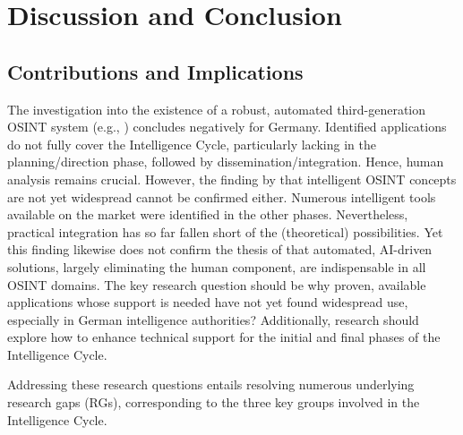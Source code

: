\documentclass[10pt]{article}
\begin{document}
\section{Discussion and Conclusion} \label{sec:discussion}
\subsection{Contributions and Implications}

The investigation into the existence of a robust, automated third-generation OSINT system (e.g., \cite{Ghioni.2023}) concludes negatively for Germany. Identified applications do not fully cover the Intelligence Cycle, particularly lacking in the planning/direction phase, followed by dissemination/integration. Hence, human analysis remains crucial. However, the finding by \textcite{PastorGalindo.2020} that intelligent OSINT
concepts are not yet widespread cannot be confirmed either. Numerous intelligent tools available
on the market were identified in the other phases. Nevertheless, practical integration has so far
fallen short of the (theoretical) possibilities. Yet this finding likewise does not confirm the
thesis of \textcite{Yogish.2021} that automated, AI-driven solutions, largely eliminating
the human component, are indispensable in all OSINT domains. The key research
question should be why proven, available applications whose support is needed have not
yet found widespread use, especially in German intelligence authorities? Additionally, research should explore how to enhance technical support for the initial and final phases of the Intelligence Cycle.

Addressing these research questions entails resolving numerous underlying research gaps (RGs), corresponding to the three key groups involved in the Intelligence Cycle.
\end{document}
